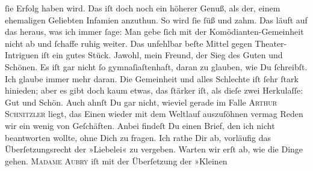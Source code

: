 \begin{ledgroupsized}[t]{13cm}
               ſie Erfolg haben wird. Das iſt doch \strikeout{\textcolor{gray}{w}} noch ein höherer Genuß, als der,  einem ehemaligen Geliebten Infamien anzuthun. So
               wird ſie  ſüß und zahm. Das läuft auf das heraus,
               was ich immer ſage: Man gebe ſich mit der Komödianten-Gemeinheit {\pb}nicht ab und ſchaffe ruhig weiter. Das unfehlbar
               beſte Mittel gegen  Theater-Intriguen iſt ein
               gutes Stück. Jawohl, mein Freund, der Sieg des Guten und Schönen. Es iſt gar nicht ſo
               gymnaſiaſtenhaft, daran zu glauben, wie Du ſchreibſt. Ich glaube immer mehr daran.
               Die Gemeinheit und alles Schlechte iſt ſehr ſtark hinieden; aber es gibt doch kaum
               etwas, das ſtärker iſt, als dieſe zwei Herkulaſſe: {\pb}Gut und Schön. Auch ahnſt Du gar nicht, wieviel gerade im Falle \textsc{Arthur Schnitzler} liegt, das Einen wieder mit dem Weltlauf
               auszuſöhnen vermag{\dotssix}\pend
           \pstart
           Reden wir ein wenig von Geſchäften. Anbei findeſt Du einen Brief, den ich nicht
               beantworten wollte, ohne Dich zu fragen. Ich rathe Dir ab, vorläufig das
               Überſetzungsrecht der »Liebelei« zu vergeben.
               Warten wir erſt ab, wie die Dinge gehen. \textsc{Madame Aubry} iſt mit der Überſetzung
               der {\pb}»Kleinen

\end{ledgroupsized}
